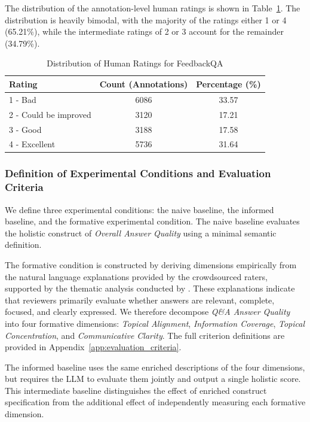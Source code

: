 The distribution of the annotation-level human ratings is shown in Table~\ref{tab:human_ratings_dist}. The distribution is heavily bimodal, with the majority of the ratings either 1 or 4 (65.21\%), while the intermediate ratings of 2 or 3 account for the remainder (34.79\%). 

\begin{table}
    \caption{Distribution of Human Ratings for FeedbackQA}\label{tab:human_ratings_dist}
    \begin{tabular}{lcc}
    \toprule
    Rating & Count (Annotations) & Percentage (\%) \\
    \midrule
        1 - Bad & 6086 & 33.57 \\
        2 - Could be improved & 3120 & 17.21 \\
        3 - Good & 3188 & 17.58 \\
        4 - Excellent & 5736 & 31.64 \\
    \bottomrule
    \end{tabular}
\end{table}


\subsubsection{Definition of Experimental Conditions and Evaluation Criteria}\label{sec:qa_experimentaldesign}

We define three experimental conditions: the naive baseline, the informed baseline, and the formative experimental condition. The naive baseline evaluates the holistic construct of \textit{Overall Answer Quality} using a minimal semantic definition.

The formative condition is constructed by deriving dimensions empirically from the natural language explanations provided by the crowdsourced raters, supported by the thematic analysis conducted by \citet{li_using_2022}. These explanations indicate that reviewers primarily evaluate whether answers are relevant, complete, focused, and clearly expressed. We therefore decompose \textit{Q\&A Answer Quality} into four formative dimensions: \textit{Topical Alignment}, \textit{Information Coverage}, \textit{Topical Concentration}, and \textit{Communicative Clarity}. The full criterion definitions are provided in Appendix~\ref{app:evaluation_criteria}.

The informed baseline uses the same enriched descriptions of the four dimensions, but requires the LLM to evaluate them jointly and output a single holistic score. This intermediate baseline distinguishes the effect of enriched construct specification from the additional effect of independently measuring each formative dimension.




